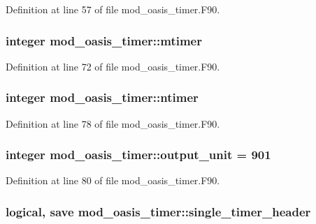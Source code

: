 Definition at line 57 of file mod\+\_\+oasis\+\_\+timer.\+F90.

\hypertarget{classmod__oasis__timer_acb04b78110e512ad551f7a500af70ef7}{
\subsubsection[{mtimer}]{\setlength{\rightskip}{0pt plus 5cm}integer mod\+\_\+oasis\+\_\+timer\+::mtimer\hspace{0.3cm}{\ttfamily [private]}}}\label{classmod__oasis__timer_acb04b78110e512ad551f7a500af70ef7}


Definition at line 72 of file mod\+\_\+oasis\+\_\+timer.\+F90.

\hypertarget{classmod__oasis__timer_aa92116f5ed11fd498b11b37e368e7b72}{
\subsubsection[{ntimer}]{\setlength{\rightskip}{0pt plus 5cm}integer mod\+\_\+oasis\+\_\+timer\+::ntimer\hspace{0.3cm}{\ttfamily [private]}}}\label{classmod__oasis__timer_aa92116f5ed11fd498b11b37e368e7b72}


Definition at line 78 of file mod\+\_\+oasis\+\_\+timer.\+F90.

\hypertarget{classmod__oasis__timer_a80e0bc610eb9e9b0aa07e926d5a9fde8}{
\subsubsection[{output\+\_\+unit}]{\setlength{\rightskip}{0pt plus 5cm}integer mod\+\_\+oasis\+\_\+timer\+::output\+\_\+unit = 901\hspace{0.3cm}{\ttfamily [private]}}}\label{classmod__oasis__timer_a80e0bc610eb9e9b0aa07e926d5a9fde8}


Definition at line 80 of file mod\+\_\+oasis\+\_\+timer.\+F90.

\hypertarget{classmod__oasis__timer_a3733877ab9fa9d07df0ff70f21cd08b0}{
\subsubsection[{single\+\_\+timer\+\_\+header}]{\setlength{\rightskip}{0pt plus 5cm}logical, save mod\+\_\+oasis\+\_\+timer\+::single\+\_\+timer\+\_\+header\hspace{0.3cm}{\ttfamily [private]}}}\label{classmod__oasis__timer_a3733877ab9fa9d07df0ff70f21cd08b0}


